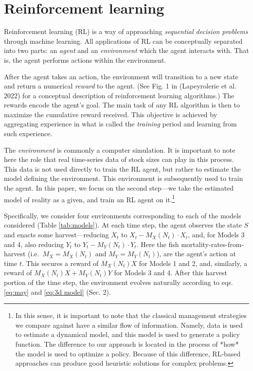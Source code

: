\documentclass{article}
\begin{document}
\hypertarget{sec:RL}{%
\section{Reinforcement learning}\label{sec:RL}}

Reinforcement learning (RL) is a way of approaching \emph{sequential
decision problems} through machine learning. All applications of RL can
be conceptually separated into two parts: an \emph{agent} and an
\emph{environment} which the agent interacts with. That is, the agent
performs actions within the environment.

After the agent takes an action, the environment will transition to a
new state and return a numerical \emph{reward} to the agent. (See Fig. 1
in (Lapeyrolerie et al. 2022) for a conceptual description of
reinforcement learning algorithms.) The rewards encode the agent's goal.
The main task of any RL algorithm is then to maximize the cumulative
reward received. This objective is achieved by aggregating experience in
what is called the \emph{training} period and learning from such
experience.

The \emph{environment} is commonly a computer simulation. It is
important to note here the role that real time-series data of stock
sizes can play in this process. This data is not used directly to train
the RL agent, but rather to estimate the model defining the environment.
This environment is subsequently used to train the agent. In this paper,
we focus on the second step---we take the estimated model of reality as
a given, and train an RL agent on it.\footnote{
In this sense, it is important to note that the classical management strategies we compare against have a similar flow of information.
Namely, data is used to estimate a dynamical model, and this model is used to generate a policy function.
The difference to our approach is located in the process of *how* the model is used to optimize a policy.
Because of this difference, RL-based approaches can produce good heuristic solutions for complex problems.
}

Specifically, we consider four environments corresponding to each of the
models considered (Table \ref{tab:models}). At each time step, the agent
observes the state \(S\) and enacts some harvest---reducing \(X_t\) to
\(X_t - M_X(N_t)\cdot X_t\), and, for Models 3 and 4, also reducing
\(Y_t\) to \(Y_t - M_Y(N_t)\cdot Y_t\). Here the fish
mortality-rates-from-harvest (i.e.~\(M_X=M_X(N_t)\) and
\(M_Y=M_Y(N_t)\)), are the agent's action at time \(t\). This secures a
reward of \(M_X(N_t)X\) for Models 1 and 2, and, similarly, a reward of
\(M_X(N_t)X + M_Y(N_t)Y\) for Models 3 and 4. After this harvest portion
of the time step, the environment evolves naturally according to eqs.
\eqref{eq:may} and \eqref{eq:3d model} (Sec. 2).
\end{document}
